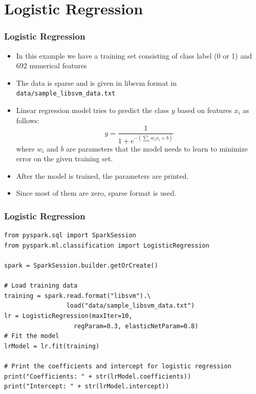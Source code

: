 \documentclass{beamer}
\begin{document}
\section{Logistic Regression}
\begin{frame}[fragile]
\frametitle{Logistic Regression}
\begin{itemize}
\item In this example we have a training set consisting of class label (0 or 1) and 692 numerical features
\item The data is sparse and is given in libsvm format in {\color{mycolorcli}\verb|data/sample_libsvm_data.txt|}
\item Linear regression model tries to predict the class $y$ based on features 
  $x_i$ as follows:
  \begin{equation*}
    y = \frac{1}{1 + e^{-(\sum_{i}{w_i x_i} + b)}} 
  \end{equation*}
  where $w_i$ and $b$ are parameters that the model needs to learn to minimize error on the given training set. 
  \item After the model is trained, the parameters are printed. 
  \item Since most of them are zero, sparse format is used.
\end{itemize}
\end{frame}


\begin{frame}[fragile]
\frametitle{Logistic Regression}
{\small
{\color{mycolorcode}
\begin{verbatim}
from pyspark.sql import SparkSession
from pyspark.ml.classification import LogisticRegression

spark = SparkSession.builder.getOrCreate()

# Load training data
training = spark.read.format("libsvm").\
                 load("data/sample_libsvm_data.txt")
lr = LogisticRegression(maxIter=10, 
                   regParam=0.3, elasticNetParam=0.8)
# Fit the model
lrModel = lr.fit(training)

# Print the coefficients and intercept for logistic regression
print("Coefficients: " + str(lrModel.coefficients))
print("Intercept: " + str(lrModel.intercept))
\end{verbatim}
}
}
\end{frame}
\end{document}
